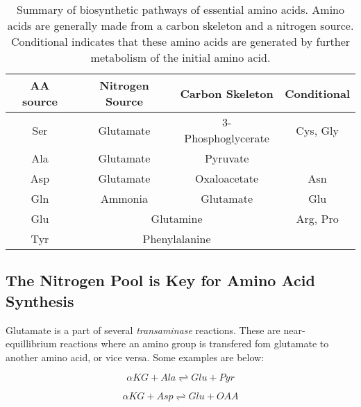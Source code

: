 \documentclass{tufte-handout}
\begin{document}
\begin{table}[h]
\centering
\caption{Summary of biosynthetic pathways of essential amino acids.  Amino acids are generally made from a carbon skeleton and a nitrogen source.  Conditional indicates that these amino acids are generated by further metabolism of the initial amino acid.}
\label{tab:aa-biosynthesis-summary}
\begin{tabular}{|c|c|c|c|}
\hline
AA source        & Nitrogen Source  & Carbon Skeleton & Conditional      \\ \hline
Ser    & Glutamate                            & 3-Phosphoglycerate                                 & Cys, Gly            \\ \hline
Ala   & Glutamate                            & Pyruvate                             &                              \\ \hline
Asp & Glutamate                         & Oxaloacetate                        & Asn                   \\ \hline
Gln & Ammonia                              & Glutamate                            &   Glu                           \\ \hline
Glu & \multicolumn{2}{c|}{Glutamine}                                              & Arg, Pro \\ \hline
Tyr  & \multicolumn{2}{c|}{Phenylalanine}                                          &                              \\ \hline
\end{tabular}
\end{table}

\subsection{The Nitrogen Pool is Key for Amino Acid Synthesis}

Glutamate is a part of several \emph{transaminase} reactions.  These are near-equillibrium reactions where an amino group is transfered fom glutamate to another amino acid, or vice versa.  Some examples are below:

 \begin{equation}\label{eq:alt}
\alpha KG + Ala \rightleftharpoons Glu + Pyr
\end{equation}

 \begin{equation}\label{eq:ast}
\alpha KG + Asp \rightleftharpoons Glu + OAA
\end{equation}
\end{document}
